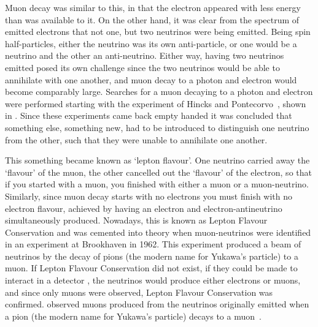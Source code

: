 
Muon decay was similar to this, in that the electron appeared with less energy than was available to it.
On the other hand, it was clear from the spectrum of emitted electrons that not one, but two neutrinos were being emitted.
Being spin half-particles, either the neutrino was its own anti-particle, or one would be a neutrino and the other an anti-neutrino.
Either way, having two neutrinos emitted posed its own challenge since the two neutrinos would be able to annihilate with one another, and muon decay to a photon and electron would become comparably large.
Searches for a muon decaying to a photon and electron were performed starting with the experiment of Hincks and Pontecorvo~\cite{Hincks194802}, shown in .
Since these experiments came back empty handed it was concluded that something else, something new, had to be introduced to distinguish one neutrino from the other, such that they were unable to annihilate one another.
\FigTheoryHincksPontecorvoMuEGamma

This something became known as 	`lepton flavour'.  
One neutrino carried away the `flavour' of the muon, the other cancelled out the `flavour' of the electron, so that if you started with a muon, you finished with either a muon or a muon-neutrino.
Similarly, since muon decay starts with no electrons you must finish with no electron flavour, achieved by having an electron and electron-antineutrino simultaneously produced.
Nowadays, this is known as Lepton Flavour Conservation and was cemented into theory when muon-neutrinos were identified in an experiment at Brookhaven in 1962.
This experiment produced a beam of neutrinos by the decay of pions (the modern name for Yukawa's particle) to a muon.
If Lepton Flavour Conservation did not exist, if they could be made to interact in a detector , the neutrinos would produce either electrons or muons, and since only muons were observed, Lepton Flavour Conservation was confirmed.
observed muons produced from the neutrinos originally emitted when a pion (the modern name for Yukawa's particle) decays to a muon~\cite{MuNeutrinoDiscovery}.

